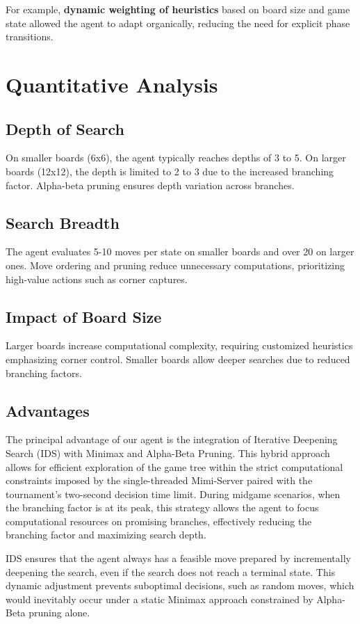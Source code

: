 \documentclass[11pt]{article}
\begin{document}
\noindent For example, \textbf{dynamic weighting of heuristics} based on board size and game state allowed the agent to adapt organically, reducing the need for explicit phase transitions.


\section*{Quantitative Analysis}
\subsection*{Depth of Search}
On smaller boards (6x6), the agent typically reaches depths of 3 to 5. On larger boards (12x12), the depth is limited to 2 to 3 due to the increased branching factor. Alpha-beta pruning ensures depth variation across branches.

\subsection*{Search Breadth}
The agent evaluates 5-10 moves per state on smaller boards and over 20 on larger ones. Move ordering and pruning reduce unnecessary computations, prioritizing high-value actions such as corner captures.

\subsection*{Impact of Board Size}
Larger boards increase computational complexity, requiring customized heuristics emphasizing corner control. Smaller boards allow deeper searches due to reduced branching factors.

\subsection*{Advantages}
The principal advantage of our agent is the integration of Iterative Deepening Search (IDS) with Minimax and Alpha-Beta Pruning. This hybrid approach allows for efficient exploration of the game tree within the strict computational constraints imposed by the single-threaded Mimi-Server paired with the tournament’s two-second decision time limit. During midgame scenarios, when the branching factor is at its peak, this strategy allows the agent to focus computational resources on promising branches, effectively reducing the branching factor and maximizing search depth.

IDS ensures that the agent always has a feasible move prepared by incrementally deepening the search, even if the search does not reach a terminal state. This dynamic adjustment prevents suboptimal decisions, such as random moves, which would inevitably occur under a static Minimax approach constrained by Alpha-Beta pruning alone.
\end{document}
